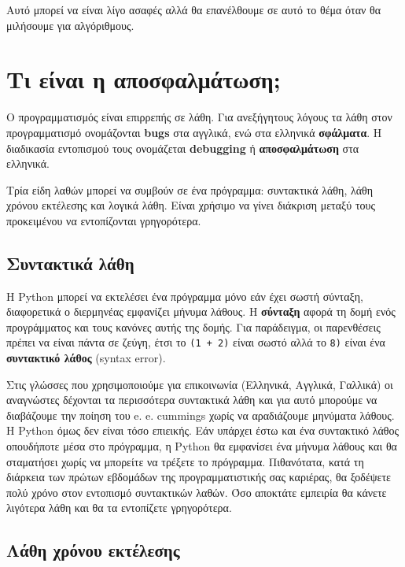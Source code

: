 \documentclass[10pt]{book}
\begin{document}
Αυτό μπορεί να είναι λίγο ασαφές αλλά θα επανέλθουμε σε αυτό το θέμα
όταν θα μιλήσουμε για αλγόριθμους.


\section{Τι είναι η αποσφαλμάτωση;}
Ο προγραμματισμός είναι επιρρεπής σε λάθη. Για ανεξήγητους λόγους
τα λάθη στον προγραμματισμό ονομάζονται {\bf bugs} στα αγγλικά,
ενώ στα ελληνικά {\bf σφάλματα}. Η διαδικασία εντοπισμού τους ονομάζεται
{\bf debugging} ή {\bf αποσφαλμάτωση} στα ελληνικά.


Τρία είδη λαθών μπορεί να συμβούν σε ένα πρόγραμμα: συντακτικά λάθη,
λάθη χρόνου εκτέλεσης και λογικά λάθη. Είναι χρήσιμο να γίνει διάκριση
μεταξύ τους προκειμένου να εντοπίζονται γρηγορότερα.

\subsection{Συντακτικά λάθη}

Η Python μπορεί να εκτελέσει ένα πρόγραμμα μόνο εάν έχει σωστή σύνταξη, διαφορετικά ο διερμηνέας εμφανίζει μήνυμα λάθους. Η {\bf σύνταξη} αφορά τη 
δομή ενός προγράμματος και τους κανόνες αυτής της δομής. 
Για παράδειγμα, οι παρενθέσεις πρέπει να είναι πάντα σε ζεύγη,
έτσι το {\tt (1 + 2)} είναι σωστό αλλά το {\tt 8)} είναι ένα
{\bf συντακτικό λάθος} (syntax error).


Στις γλώσσες που χρησιμοποιούμε για επικοινωνία (Ελληνικά, Αγγλικά, Γαλλικά) οι αναγνώστες δέχονται τα περισσότερα συντακτικά λάθη και για αυτό μπορούμε να διαβάζουμε την ποίηση του  e. e. cummings χωρίς να αραδιάζουμε μηνύματα λάθους.  Η Python όμως δεν
είναι τόσο επιεικής.  Εάν υπάρχει έστω και ένα συντακτικό λάθος
οπουδήποτε μέσα στο πρόγραμμα, η  Python  θα εμφανίσει ένα
μήνυμα λάθους και θα σταματήσει χωρίς να μπορείτε να τρέξετε
το πρόγραμμα. Πιθανότατα, κατά τη διάρκεια των πρώτων εβδομάδων της προγραμματιστικής σας καριέρας, θα ξοδέψετε πολύ χρόνο στον εντοπισμό συντακτικών λαθών.  Όσο αποκτάτε εμπειρία θα κάνετε λιγότερα λάθη και θα τα εντοπίζετε γρηγορότερα.

\subsection{Λάθη χρόνου εκτέλεσης}
\label{runtime}
\end{document}
